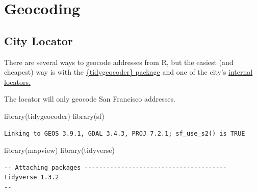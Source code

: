 \documentclass[
  letterpaper,
  DIV=11,
  numbers=noendperiod]{scrreprt}
\newenvironment{Shaded}{\begin{snugshade}}{\end{snugshade}}
\newcommand{\FunctionTok}[1]{\textcolor[rgb]{0.28,0.35,0.67}{#1}}
\newcommand{\NormalTok}[1]{\textcolor[rgb]{0.00,0.23,0.31}{#1}}
\begin{document}

\chapter{Geocoding}\label{geocoding}

\section{City Locator}\label{city-locator}

There are several ways to geocode addresses from R, but the easiest (and
cheapest) way is with the
\href{https://jessecambon.github.io/tidygeocoder/}{\{tidygeocoder\}
package} and one of the city's
\href{https://gis.sf.gov/svc/rest/services/loc/c83_eas_str_ctrl_composite/GeocodeServer/findAddressCandidates}{internal
locators.}

\begin{tcolorbox}[enhanced jigsaw, breakable, coltitle=black, opacitybacktitle=0.6, opacityback=0, leftrule=.75mm, colbacktitle=quarto-callout-note-color!10!white, toprule=.15mm, colframe=quarto-callout-note-color-frame, colback=white, left=2mm, bottomrule=.15mm, rightrule=.15mm, bottomtitle=1mm, toptitle=1mm, title=\textcolor{quarto-callout-note-color}{\faInfo}\hspace{0.5em}{Note}, titlerule=0mm, arc=.35mm]

The locator will only geocode San Francisco addresses.

\end{tcolorbox}

\begin{Shaded}
\begin{Highlighting}[]
\FunctionTok{library}\NormalTok{(tidygeocoder)}
\FunctionTok{library}\NormalTok{(sf)}
\end{Highlighting}
\end{Shaded}

\begin{verbatim}
Linking to GEOS 3.9.1, GDAL 3.4.3, PROJ 7.2.1; sf_use_s2() is TRUE
\end{verbatim}

\begin{Shaded}
\begin{Highlighting}[]
\FunctionTok{library}\NormalTok{(mapview)}
\FunctionTok{library}\NormalTok{(tidyverse)}
\end{Highlighting}
\end{Shaded}

\begin{verbatim}
-- Attaching packages --------------------------------------- tidyverse 1.3.2
--
\end{verbatim}
\end{document}
